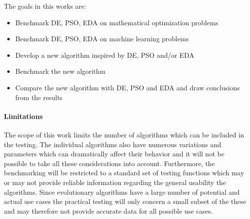 The goals in this works are:
\begin{itemize}
  \item Benchmark DE, PSO, EDA on mathematical optimization problems
  \item Benchmark DE, PSO, EDA on machine learning problems
  \item Develop a new algorithm inspired by DE, PSO and/or EDA
  \item Benchmark the new algorithm
  \item Compare the new algorithm with DE, PSO and EDA and draw conclusions from the results
\end{itemize}

\paragraph{Limitations}

The scope of this work limits the number of algorithms which can be included in the testing. The individual algorithms also have numerous variations and parameters which can dramatically affect their behavior and it will not be possible to take all these considerations into account. Furthermore, the benchmarking will be restricted to a standard set of testing functions which may or may not provide reliable information regarding the general usability the algorithms. Since evolutionary algorithms have a large number of potential and actual use cases the practical testing will only concern a small subset of the these and may therefore not provide accurate data for all possible use cases.
